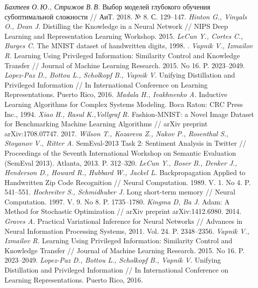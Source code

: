\begin{thebibliography}{10}
	\textit{Бахтеев О.\,Ю., Стрижов В.\,В.} Выбор моделей глубокого обучения субоптимальной сложности // АиТ. 2018. № 8. С. 129--147.
        \textit{Hinton G., Vinyals O., Dean J.} Distilling the Knowledge in a Neural Network // NIPS Deep Learning and Representation Learning Workshop. 2015.
	\textit{LeCun Y.,  Cortes C., Burges C.} The MNIST dataset of handwritten digits, 1998. .
	\textit{Vapnik V., Izmailov R.} Learning Using Privileged Information: Similarity Control and Knowledge Transfer // Journal of Machine Learning Research. 2015. No 16. P. 2023--2049.
	\textit{Lopez-Paz D., Bottou L., Scholkopf B., Vapnik V.} Unifying Distillation and Privileged Information // In International Conference on Learning Representations. Puerto Rico, 2016.
	\textit{Madala H., Ivakhnenko A.} Inductive Learning Algorithms for Complex Systems Modeling. Boca Raton: CRC Press Inc., 1994.
	\textit{Xiao H., Rasul K.,Vollgraf R.} Fashion-MNIST: a Novel Image Dataset for Benchmarking Machine Learning Algorithms // arXiv preprint arXiv:1708.07747. 2017.
	\textit{Wilson T., Kozareva Z., Nakov P., Rosenthal S., Stoyanov V., Ritter A.} {S}em{E}val-2013 Task 2: Sentiment Analysis in Twitter // Proceedings of the Seventh International Workshop on Semantic Evaluation ({S}em{E}val 2013). Atlanta, 2013. P. 312--320.
	\textit{LeCun Y., Boser B., Denker J., Henderson D., Howard R., Hubbard W., Jackel L.} Backpropagation Applied to Handwritten Zip Code Recognition // Neural Computation. 1989. V. 1. No 4. P. 541--551.
	\textit{Hochreiter S., Schmidhuber J.} Long short-term memory // Neural Computation. 1997. V. 9. No 8.  P. 1735--1780.
	\textit{Kingma D, Ba J.} Adam: A Method for Stochastic Optimization // arXiv preprint arXiv:1412.6980. 2014.
	\textit{Graves A.} Practical Variational Inference for Neural Networks // Advances in Neural Information Processing Systems, 2011. Vol. 24. P. 2348--2356.
	\textit{Vapnik V., Izmailov R.} Learning Using Privileged Information: Similarity Control and Knowledge Transfer // Journal of Machine Learning Research. 2015. No 16. P. 2023--2049.
	\textit{Lopez-Paz D., Bottou L., Scholkopf B., Vapnik V.} Unifying Distillation and Privileged Information // In International Conference on Learning Representations. Puerto Rico, 2016.
	

\end{thebibliography}
